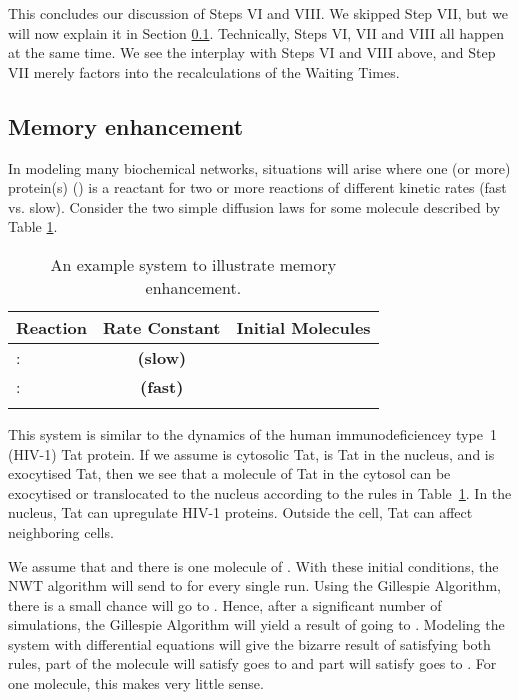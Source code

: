\documentclass[copyright]{eptcs}
\begin{document}
This concludes our discussion of Steps VI and VIII.  We skipped Step VII, but we will now explain it in Section \ref{memenhance}.  Technically, Steps VI, VII and VIII all happen at the same time.  We see the interplay with Steps VI and VIII above, and Step VII merely factors into the recalculations of the Waiting Times.

\subsection{Memory enhancement}\label{memenhance}

In modeling many biochemical networks, situations will arise where one (or more) protein(s) 
() is a reactant for two or more reactions of different kinetic rates 
(fast vs. slow).  Consider the two simple diffusion laws for some molecule  described by 
Table \ref{simptab}.

{\renewcommand{\arraystretch}{1.2}\begin{table}[h!t!p!]
\centering
\caption{An example system to illustrate memory enhancement.} \label{simptab}\vspace*{1mm}
\begin{tabular}{|l|c|c|}
\hline
Reaction & Rate Constant & Initial Molecules\\
\hline
:  &  {\bf(slow)} & \\
\hline
:  &  {\bf(fast)} & \\
\hline
& & \\
\hline
\end{tabular}
\end{table}}

This system is similar to the dynamics of the human immunodeficiencey type~1 (HIV-1) Tat protein.  If we assume  is cytosolic Tat,  is Tat in the nucleus, and  is exocytised Tat, then we see that a molecule of Tat in the cytosol can be exocytised or translocated to the nucleus \cite{selliah01} according to the rules in Table~\ref{simptab}.  In the nucleus, Tat can upregulate HIV-1 proteins.  Outside the cell, Tat can affect neighboring cells.

We assume that  and there is one molecule of .  With these initial conditions, the NWT algorithm will send  to  for every single run.  Using the Gillespie Algorithm, there is a small chance  will go to .  Hence, after a significant number of simulations, the Gillespie Algorithm will yield a result of  going to . Modeling the system with differential equations will give the bizarre result of satisfying both rules, part of the molecule will satisfy  goes to  and part will satisfy  goes to .  For one molecule, this makes very little sense.
\end{document}
